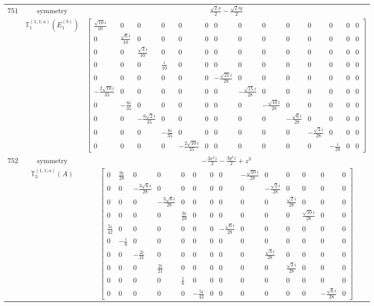 \documentclass[fleqn,8pt,landscape]{jsarticle}
\begin{document}
\begin{longtable}{ccc}
$ 751 $ & $ \text{symmetry} $ & $ \frac{\sqrt{2} x}{2} - \frac{\sqrt{2} i y}{2} $ \\
$  $ & $ \mathbb{T}_{1}^{(1,1;a)}(E_{1}^{(b)}) $ & $ \begin{bmatrix} \frac{\sqrt{10} i}{10} & 0 & 0 & 0 & 0 & 0 & 0 & 0 & 0 & 0 & 0 & 0 & 0 & 0 \\ 0 & \frac{\sqrt{6} i}{10} & 0 & 0 & 0 & 0 & 0 & 0 & 0 & 0 & 0 & 0 & 0 & 0 \\ 0 & 0 & \frac{\sqrt{3} i}{10} & 0 & 0 & 0 & 0 & 0 & 0 & 0 & 0 & 0 & 0 & 0 \\ 0 & 0 & 0 & \frac{i}{10} & 0 & 0 & 0 & 0 & 0 & 0 & 0 & 0 & 0 & 0 \\ 0 & 0 & 0 & 0 & 0 & 0 & - \frac{\sqrt{21} i}{28} & 0 & 0 & 0 & 0 & 0 & 0 & 0 \\ - \frac{2 \sqrt{10} i}{35} & 0 & 0 & 0 & 0 & 0 & 0 & - \frac{\sqrt{15} i}{28} & 0 & 0 & 0 & 0 & 0 & 0 \\ 0 & - \frac{8 i}{35} & 0 & 0 & 0 & 0 & 0 & 0 & - \frac{\sqrt{10} i}{28} & 0 & 0 & 0 & 0 & 0 \\ 0 & 0 & - \frac{6 \sqrt{2} i}{35} & 0 & 0 & 0 & 0 & 0 & 0 & - \frac{\sqrt{6} i}{28} & 0 & 0 & 0 & 0 \\ 0 & 0 & 0 & - \frac{8 i}{35} & 0 & 0 & 0 & 0 & 0 & 0 & - \frac{\sqrt{3} i}{28} & 0 & 0 & 0 \\ 0 & 0 & 0 & 0 & - \frac{2 \sqrt{10} i}{35} & 0 & 0 & 0 & 0 & 0 & 0 & - \frac{i}{28} & 0 & 0 \end{bmatrix} $ \\ \hline
$ 752 $ & $ \text{symmetry} $ & $ - \frac{3 x^{2} z}{2} - \frac{3 y^{2} z}{2} + z^{3} $ \\
$  $ & $ \mathbb{T}_{3}^{(1,1;a)}(A) $ & $ \begin{bmatrix} 0 & \frac{9 i}{28} & 0 & 0 & 0 & 0 & 0 & 0 & - \frac{\sqrt{10} i}{28} & 0 & 0 & 0 & 0 & 0 \\ 0 & 0 & - \frac{3 \sqrt{6} i}{28} & 0 & 0 & 0 & 0 & 0 & 0 & - \frac{\sqrt{2} i}{28} & 0 & 0 & 0 & 0 \\ 0 & 0 & 0 & - \frac{3 \sqrt{6} i}{28} & 0 & 0 & 0 & 0 & 0 & 0 & \frac{\sqrt{2} i}{28} & 0 & 0 & 0 \\ 0 & 0 & 0 & 0 & \frac{9 i}{28} & 0 & 0 & 0 & 0 & 0 & 0 & \frac{\sqrt{10} i}{28} & 0 & 0 \\ \frac{5 i}{42} & 0 & 0 & 0 & 0 & 0 & 0 & - \frac{\sqrt{6} i}{28} & 0 & 0 & 0 & 0 & 0 & 0 \\ 0 & - \frac{i}{6} & 0 & 0 & 0 & 0 & 0 & 0 & 0 & 0 & 0 & 0 & 0 & 0 \\ 0 & 0 & - \frac{2 i}{21} & 0 & 0 & 0 & 0 & 0 & 0 & \frac{\sqrt{3} i}{28} & 0 & 0 & 0 & 0 \\ 0 & 0 & 0 & \frac{2 i}{21} & 0 & 0 & 0 & 0 & 0 & 0 & \frac{\sqrt{3} i}{28} & 0 & 0 & 0 \\ 0 & 0 & 0 & 0 & \frac{i}{6} & 0 & 0 & 0 & 0 & 0 & 0 & 0 & 0 & 0 \\ 0 & 0 & 0 & 0 & 0 & - \frac{5 i}{42} & 0 & 0 & 0 & 0 & 0 & 0 & - \frac{\sqrt{6} i}{28} & 0 \end{bmatrix} $ \\ \hline

\end{longtable}
\end{document}
